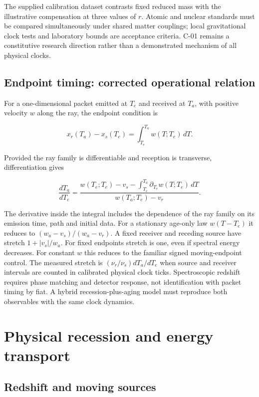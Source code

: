 \documentclass[
  11pt,
  twoside]{article}
\begin{document}
The supplied calibration dataset contrasts fixed reduced mass with the
illustrative compensation at three values of \(r\). Atomic and nuclear
standards must be compared simultaneously under shared matter couplings;
local gravitational clock tests and laboratory bounds are acceptance
criteria. C-01 remains a constitutive research direction rather than a
demonstrated mechanism of all physical clocks.

\subsection{Endpoint timing: corrected operational
relation}\label{endpoint-timing-corrected-operational-relation}

For a one-dimensional packet emitted at \(T_e\) and received at \(T_a\),
with positive velocity \(w\) along the ray, the endpoint condition is

\[x_r(T_a)-x_s(T_e)=\int_{T_e}^{T_a}w(T;T_e)\,dT.\]

Provided the ray family is differentiable and reception is transverse,
differentiation gives

\[\frac{dT_a}{dT_e}=\frac{w(T_e;T_e)-v_s-\int_{T_e}^{T_a}\partial_{T_e}w(T;T_e)\,dT}{w(T_a;T_e)-v_r}.\]

The derivative inside the integral includes the dependence of the ray
family on its emission time, path and initial data. For a stationary
age-only law \(w(T-T_e)\) it reduces to \((w_a-v_s)/(w_a-v_r)\). A fixed
receiver and receding source have stretch \(1+|v_s|/w_a\). For fixed
endpoints stretch is one, even if spectral energy decreases. For
constant \(w\) this reduces to the familiar signed moving-endpoint
control. The measured stretch is \((\nu_r/\nu_s)dT_a/dT_e\) when source
and receiver intervals are counted in calibrated physical clock ticks.
Spectroscopic redshift requires phase matching and detector response,
not identification with packet timing by fiat. A hybrid
recession-plus-aging model must reproduce both observables with the same
clock dynamics.

\section{Physical recession and energy
transport}\label{physical-recession-and-energy-transport}

\subsection{Redshift and moving
sources}\label{redshift-and-moving-sources}
\end{document}
